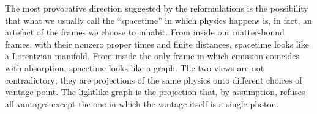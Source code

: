 \documentclass[11pt]{article}
\begin{document}
The most provocative direction suggested by the reformulations is the possibility that what we usually call the ``spacetime'' in which physics happens is, in fact, an artefact of the frames we choose to inhabit. From inside our matter-bound frames, with their nonzero proper times and finite distances, spacetime looks like a Lorentzian manifold. From inside the only frame in which emission coincides with absorption, spacetime looks like a graph. The two views are not contradictory; they are projections of the same physics onto different choices of vantage point. The lightlike graph is the projection that, by assumption, refuses all vantages except the one in which the vantage itself is a single photon.
\end{document}
